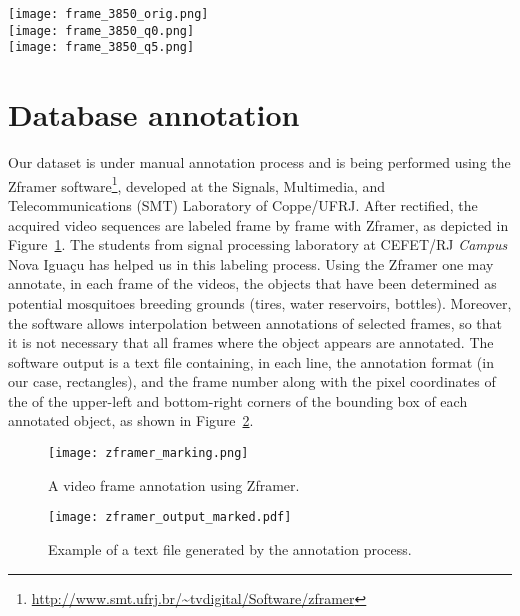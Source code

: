 \begin{figure*}[htb!]
	\centering
	\texttt{[image: frame\_3850\_orig.png]}\\
	\vspace{2mm}
	\texttt{[image: frame\_3850\_q0.png]}\\
	\vspace{2mm}
	\texttt{[image: frame\_3850\_q5.png]}
	\caption[Compression quality comparison]{Compression quality comparison. From up to down: frame from original video, quality = 0, and quality = 5.}
	\label{fig:compression_vis}
\end{figure*}

  \section{Database annotation}\label{sec:annot}
  Our dataset is under manual annotation process and is being performed using the Zframer software\footnote{\url{http://www.smt.ufrj.br/~tvdigital/Software/zframer}}, developed at the Signals, Multimedia, and Telecommunications (SMT)
   Laboratory of Coppe/UFRJ.
  After rectified, the acquired video sequences are labeled frame by frame with Zframer, as depicted in Figure~\ref{fig:zframer1}.
  The students from signal processing laboratory at CEFET/RJ {\it Campus} Nova Iguaçu has helped us in this labeling process.
  Using the Zframer one may annotate, in each frame of the videos, the objects that have been determined as potential mosquitoes breeding grounds (\eg tires, water reservoirs, bottles).
  Moreover, the software allows interpolation between annotations of selected frames, so that it is not necessary that all frames where the object appears are annotated.
  The software output is a text file containing, in each line, the annotation format (in our case, rectangles), and the frame number along with the pixel coordinates of the of the upper-left and bottom-right corners of the bounding box of each annotated object, as shown in Figure~\ref{fig:zframer_output}.
\begin{figure}[htb]
	\centering
	\texttt{[image: zframer\_marking.png]}%
	\caption{A video frame annotation using Zframer.}
	\label{fig:zframer1}
\end{figure}
%
\begin{figure}[htb]
	\centering
	\texttt{[image: zframer\_output\_marked.pdf]}
	\caption{Example of a text file generated by the annotation process.}
	\label{fig:zframer_output}
\end{figure}


